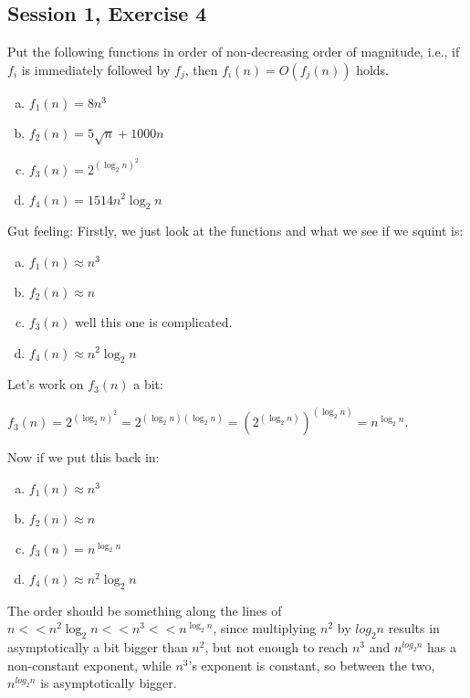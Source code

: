 \subsection{Session 1, Exercise 4}


Put the following functions in order of non-decreasing order of magnitude, i.e., if $f_i$ is immediately followed by $f_j$, then $f_i(n) = O(f_j(n))$ holds.

\begin{enumerate}[a.)]
\item $f_1(n) = 8n^3$
\item $f_2(n) = 5\sqrt{n} + 1000n$
\item $f_3(n) = 2^{(\log_{2}n)^2}$
\item $f_4(n) = 1514n^{2}\log_{2}n$
\end{enumerate}


Gut feeling: Firstly, we just look at the functions and what we see if we squint is:

\begin{enumerate}[a.)]
\item $f_1(n) \approx n^3$
\item $f_2(n) \approx n$
\item $f_3(n)$ well this one is complicated.
\item $f_4(n) \approx n^{2}\log_{2}n$
\end{enumerate}

Let's work on $f_3(n)$ a bit:

$f_3(n) = 2^{(\log_{2}n)^2} = 2^{(\log_{2}n)(\log_{2}n)} = (2^{(\log_{2}n)})^{(\log_{2}n)} = n^{\log_{2}n}$.

Now if we put this back in:

\begin{enumerate}[a.)]
\item $f_1(n) \approx n^3$
\item $f_2(n) \approx n$
\item $f_3(n) = n^{\log_{2}n}$
\item $f_4(n) \approx n^{2}\log_{2}n$
\end{enumerate}

The order should be something along the lines of $n << n^{2}\log_{2}n << n^3 << n^{\log_{2}n}$, since multiplying $n^2$ by $log_2n$ results in asymptotically a bit bigger than $n^2$, but not enough to reach $n^3$ and $n^{log_2n}$ has a non-constant exponent, while $n^3$'s exponent is constant, so between the two, $n^{log_2n}$ is asymptotically bigger.

